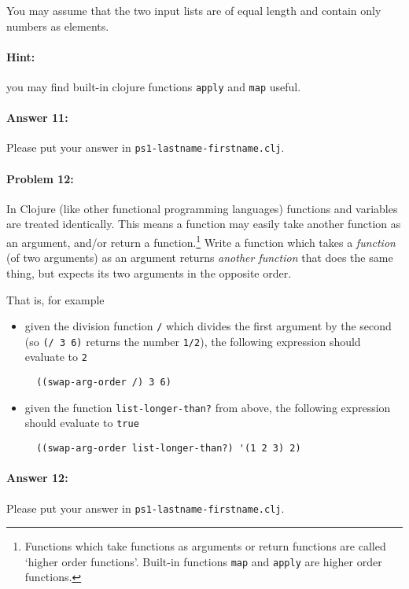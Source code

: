\documentclass[10pt]{article}
\newcommand{\required}[1]{{\color{blue}{#1}}}
\newcommand{\PSnum}{1}
\begin{document}
You may assume that the two input lists are of equal length and contain only
numbers as elements.

\paragraph*{Hint:} you may find built-in clojure functions \texttt{apply} and
\texttt{map} useful.

\paragraph{Answer 11:} Please put your answer in
\texttt{ps\PSnum-lastname-firstname.clj}.

\noindent\hrulefill%

\paragraph{Problem 12:} In Clojure (like other functional programming languages)
functions and variables are treated identically. This means a function may
easily take another function as an argument, and/or return a
function.\footnote{Functions which take functions as arguments or return
  functions are called `higher order functions'. Built-in functions \texttt{map}
and \texttt{apply} are higher order functions.} Write a function
\required{\texttt{swap-arg-order}} which takes a \emph{function} (of two
arguments) as an argument returns \emph{another function} that does the same
thing, but expects its two arguments in the opposite order.

That is, for example
\begin{itemize}[nosep]
  \item given the division function \texttt{/} which divides the first argument
    by the second (so \texttt{(/ 3 6)} returns the number \texttt{1/2}), the
    following expression should evaluate to \texttt{2}
    \begin{lstlisting}
  ((swap-arg-order /) 3 6)
    \end{lstlisting}
  \item given the function \texttt{list-longer-than?} from above, the following
    expression should evaluate to \texttt{true}
    \begin{lstlisting}
  ((swap-arg-order list-longer-than?) '(1 2 3) 2)
    \end{lstlisting}
\end{itemize}

\paragraph{Answer 12:} Please put your answer in
\texttt{ps\PSnum-lastname-firstname.clj}.
\end{document}
